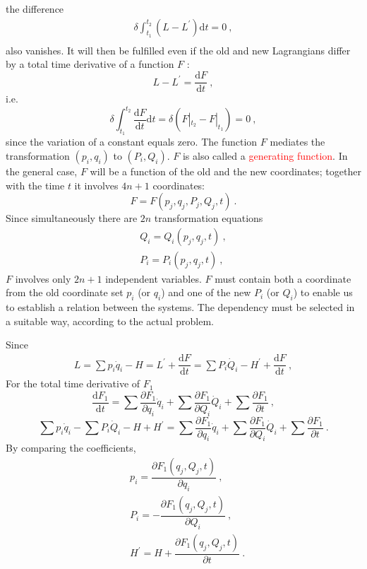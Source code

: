 \documentclass[11pt,a4paper]{article}
\newcommand{\dif}{\mathrm{d}}
\begin{document}
the difference
\begin{align}
\delta \int_{t_1}^{t_2} (L-L^\prime) \dif t= 0 ~, \\
\end{align}
also vanishes. It will then be fulfilled even if the old and new Lagrangians differ by a total time derivative of a function $F$ :
\begin{equation*}
L-L^\prime = \dfrac{\dif F}{\dif t} ~,
\end{equation*}
i.e.
\begin{equation*}
\delta \int_{t_1}^{t_2} \dfrac{\dif F}{\dif t}  \dif t =  \delta(F|_{t_2} -F|_{t_1}) = 0 ~,
\end{equation*}
since the variation of a constant equals zero. The function $F$ mediates the transformation $(p_i, q_i)$ to $(P_i, Q_i)$. $F$ is  also called a \textcolor{red}{generating function}. In the general case, $F$ will be a function of the old and the new coordinates; together with the time $t$ it involves $4n + 1$ coordinates:
\begin{equation*}
F = F (p_j, q_j, P_j, Q_j, t) ~.
\end{equation*}
Since simultaneously there are $2n$ transformation equations
\begin{align}
Q_i = Q_i(p_j, q_j, t) ~, \\
P_i = P_i(p_j, q_j, t) ~,
\end{align}
$F$ involves only $2n + 1$ independent variables. $F$ must contain both a coordinate from the old coordinate set $p_i$ (or $q_i$) and one of the new $P_i$ (or $Q_i$) to enable us to establish a relation between the systems. The dependency must be selected in a suitable way, according to the actual problem.

Since 
\begin{align*}
L = \sum p_i \dot{q}_i - H = L^\prime + \dfrac{\dif F}{\dif t} = \sum P_i \dot{Q}_i - H^\prime + \dfrac{\dif F}{\dif t} ~, 
\end{align*}
For the total time derivative of $F_1$
\begin{equation*}
\dfrac{\dif F_1}{\dif t} = \sum \dfrac{\partial F_1}{\partial q_i}  \dot{q}_i + \sum \dfrac{\partial F_1}{\partial Q_i}  \dot{Q}_i + \sum \dfrac{\partial F_1}{\partial t}  ~,
\end{equation*}
\begin{equation*}
\sum p_i \dot{q}_i - \sum P_i \dot{Q}_i -H +H^\prime =  \sum \dfrac{\partial F_1}{\partial q_i}  \dot{q}_i + \sum \dfrac{\partial F_1}{\partial Q_i}  \dot{Q}_i + \sum \dfrac{\partial F_1}{\partial t} ~.
\end{equation*}
By comparing the coefficients, 
\begin{align*}
& p_i = \dfrac{\partial F_1(q_j, Q_j, t)}{\partial q_i} ~, \\
& P_i = -\dfrac{\partial F_1(q_j, Q_j, t)}{\partial Q_i} ~, \\
& H^\prime = H +\dfrac{\partial F_1(q_j, Q_j, t)}{\partial t} ~.
\end{align*}
\end{document}
